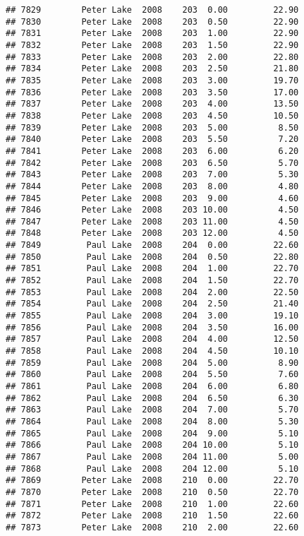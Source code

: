 \documentclass[
]{article}
\begin{document}
\begin{verbatim}
## 7829        Peter Lake  2008    203  0.00         22.90
## 7830        Peter Lake  2008    203  0.50         22.90
## 7831        Peter Lake  2008    203  1.00         22.90
## 7832        Peter Lake  2008    203  1.50         22.90
## 7833        Peter Lake  2008    203  2.00         22.80
## 7834        Peter Lake  2008    203  2.50         21.80
## 7835        Peter Lake  2008    203  3.00         19.70
## 7836        Peter Lake  2008    203  3.50         17.00
## 7837        Peter Lake  2008    203  4.00         13.50
## 7838        Peter Lake  2008    203  4.50         10.50
## 7839        Peter Lake  2008    203  5.00          8.50
## 7840        Peter Lake  2008    203  5.50          7.20
## 7841        Peter Lake  2008    203  6.00          6.20
## 7842        Peter Lake  2008    203  6.50          5.70
## 7843        Peter Lake  2008    203  7.00          5.30
## 7844        Peter Lake  2008    203  8.00          4.80
## 7845        Peter Lake  2008    203  9.00          4.60
## 7846        Peter Lake  2008    203 10.00          4.50
## 7847        Peter Lake  2008    203 11.00          4.50
## 7848        Peter Lake  2008    203 12.00          4.50
## 7849         Paul Lake  2008    204  0.00         22.60
## 7850         Paul Lake  2008    204  0.50         22.80
## 7851         Paul Lake  2008    204  1.00         22.70
## 7852         Paul Lake  2008    204  1.50         22.70
## 7853         Paul Lake  2008    204  2.00         22.50
## 7854         Paul Lake  2008    204  2.50         21.40
## 7855         Paul Lake  2008    204  3.00         19.10
## 7856         Paul Lake  2008    204  3.50         16.00
## 7857         Paul Lake  2008    204  4.00         12.50
## 7858         Paul Lake  2008    204  4.50         10.10
## 7859         Paul Lake  2008    204  5.00          8.90
## 7860         Paul Lake  2008    204  5.50          7.60
## 7861         Paul Lake  2008    204  6.00          6.80
## 7862         Paul Lake  2008    204  6.50          6.30
## 7863         Paul Lake  2008    204  7.00          5.70
## 7864         Paul Lake  2008    204  8.00          5.30
## 7865         Paul Lake  2008    204  9.00          5.10
## 7866         Paul Lake  2008    204 10.00          5.10
## 7867         Paul Lake  2008    204 11.00          5.00
## 7868         Paul Lake  2008    204 12.00          5.10
## 7869        Peter Lake  2008    210  0.00         22.70
## 7870        Peter Lake  2008    210  0.50         22.70
## 7871        Peter Lake  2008    210  1.00         22.60
## 7872        Peter Lake  2008    210  1.50         22.60
## 7873        Peter Lake  2008    210  2.00         22.60

\end{verbatim}
\end{document}
